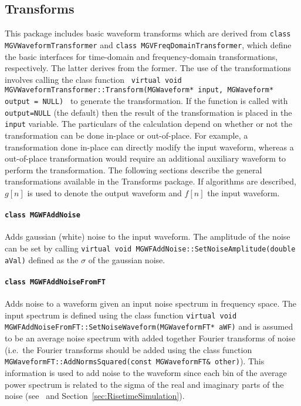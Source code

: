 		\subsection{Transforms}
		\label{sec:MGDOTransforms}
		
	This package includes basic waveform transforms which are derived from \lstinline!class MGVWaveformTransformer!  and \lstinline!class MGVFreqDomainTransformer!, which define the basic interfaces for time-domain and  frequency-domain transformations, respectively.  The latter derives from the former.  The use of the transformations involves calling the class function
\lstinline! virtual void MGVWaveformTransformer::Transform(MGWaveform* input, MGWaveform* output = NULL) ! to generate the transformation.  If the function is called with \lstinline!output=NULL! (the default) then the result of the transformation is placed in the \lstinline!input! variable.  The particulars of the calculation depend on whether or not the transformation can be done in-place or out-of-place.  For example, a transformation done in-place can directly modify the input waveform, whereas a out-of-place transformation would require an additional auxiliary waveform to perform the transformation.  The following sections describe the general transformations available in the Transforms package.  If algorithms are described, $g[n]$ is used to denote the output waveform and $f[n]$ the input waveform.
	
	
			\paragraph{\lstinline!class MGWFAddNoise!} 
	Adds gaussian (white) noise to the input waveform.  The amplitude of the noise can be set by calling \lstinline!virtual void MGWFAddNoise::SetNoiseAmplitude(double aVal)! defined as the $\sigma$ of the gaussian noise.  
			
			\paragraph{\lstinline!class MGWFAddNoiseFromFT!} 

Adds noise to a waveform given an input noise spectrum in frequency space.  The input spectrum is defined using the class function \lstinline!virtual void MGWFAddNoiseFromFT::SetNoiseWaveform(MGWaveformFT* aWF)! and is assumed
to be an average noise spectrum with added together Fourier transforms of noise (i.e.~the Fourier transforms should be added using the class function \lstinline!MGWaveformFT::AddNormsSquared(const MGWaveformFT& other)!).  This information is used to add noise to the waveform since each bin of the average power spectrum is related to the sigma of the real and imaginary
parts of the noise (see~\cite{WanThesis08} and Section~\ref{sec:RisetimeSimulation}).  

